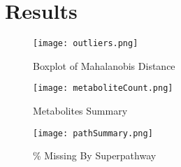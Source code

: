 \documentclass{article}
\begin{document}
\section*{Results}



\begin{figure}
  \caption{Boxplot of Mahalanobis Distance}
  \texttt{[image: outliers.png]}
  \centering
  \label{fig:mahDist}
  \end{figure}

\begin{figure}
  \caption{Metabolites Summary}
  \texttt{[image: metaboliteCount.png]}
  \centering
  \label{fig:metabSum}
  \end{figure}

\begin{figure}
  \caption{\% Missing By Superpathway}
  \texttt{[image: pathSummary.png]}
  \centering
  \label{fig:pathMiss}
  \end{figure}


\end{document}
